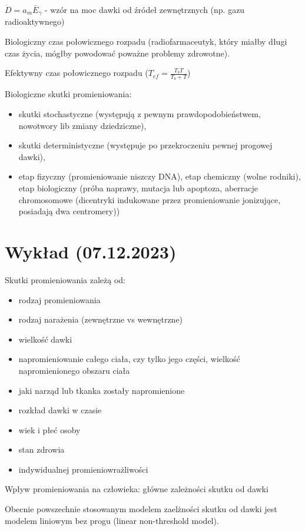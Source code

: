 \documentclass{article}
\begin{document}
$\dot{D} = a_m \bar{E}_{\gamma}$ - wzór na moc dawki od źródeł zewnętrznych (np. gazu radioaktywnego)

Biologiczny czas połowicznego rozpadu (radiofarmaceutyk, który miałby długi czas życia, mógłby powodować poważne problemy zdrowotne).

Efektywny czas połowicznego rozpadu ($T_{ef} = \frac{T_bT}{T_b + T}$)

Biologiczne skutki promieniowania:

\begin{itemize}
    \item skutki stochastyczne (występują z pewnym prawdopodobieństwem, nowotwory lib zmiany dziedziczne),
    \item skutki deterministyczne (występuje po przekroczeniu pewnej progowej dawki),
    \item etap fizyczny (promieniowanie niszczy DNA), etap chemiczny (wolne rodniki), etap biologiczny (próba naprawy, mutacja lub apoptoza, aberracje chromosomowe (dicentryki indukowane przez promieniowanie jonizujące, posiadają dwa centromery))
\end{itemize}

\section{Wykład (07.12.2023)}

Skutki promieniowania zależą od:
\begin{itemize}
    \item rodzaj promieniowania
    \item rodzaj narażenia (zewnętrzne vs wewnętrzne)
    \item wielkość dawki
    \item napromieniowanie całego ciała, czy tylko jego części, wielkość napromienionego obszaru ciała
    \item jaki narząd lub tkanka zostały napromienione
    \item rozkład dawki w czasie
    \item wiek i płeć osoby
    \item stan zdrowia
    \item indywidualnej promieniowrażliwości
\end{itemize}

Wpływ promieniowania na człowieka: główne zależności skutku od dawki

Obecnie powszechnie stosowanym modelem zaelżności skutku od dawki jest modelem liniowym bez progu (linear non-threshold model).
\end{document}
